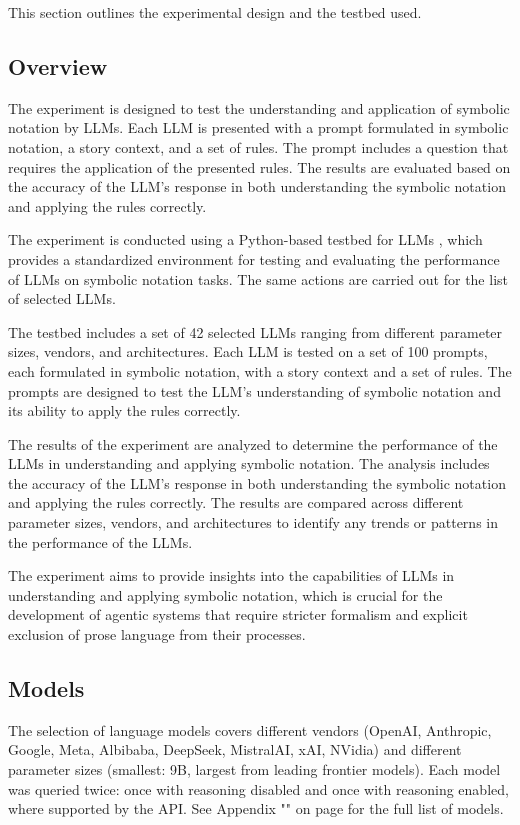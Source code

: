 This section outlines the experimental design and the testbed used.

\subsection{Overview}
The experiment is designed to test the understanding and application of symbolic notation by LLMs. Each LLM is presented with a prompt 
formulated in symbolic notation, a story context, and a set of rules. The prompt includes a question that requires the application of the 
presented rules. The results are evaluated based on the accuracy of the LLM's response in both understanding the symbolic notation and 
applying the rules correctly.

The experiment is conducted using a Python-based testbed for LLMs \autocite{aisymbolicprogllms}, which provides a standardized 
environment for testing and evaluating the performance of LLMs on symbolic notation tasks. The same actions are carried out for the list of 
selected LLMs.

The testbed includes a set of 42 selected LLMs ranging from different parameter sizes, vendors, and architectures. 
Each LLM is tested on a set of 100 prompts, each formulated in symbolic notation, with a story context and a set of rules. 
The prompts are designed to test the LLM's understanding of symbolic notation and its ability to apply the rules correctly.

The results of the experiment are analyzed to determine the performance of the LLMs in understanding and applying symbolic notation. 
The analysis includes the accuracy of the LLM's response in both understanding the symbolic notation and applying the rules correctly. 
The results are compared across different parameter sizes, vendors, and architectures to identify any trends or patterns in the performance of the LLMs.

The experiment aims to provide insights into the capabilities of LLMs in understanding and applying symbolic notation, which is crucial 
for the development of agentic systems that require stricter formalism and explicit exclusion of prose language from their processes.

\subsection{Models}
The selection of language models covers different vendors (OpenAI, Anthropic, Google, Meta, Albibaba, DeepSeek, MistralAI, xAI, NVidia) and different 
parameter sizes (smallest: 9B, largest from leading frontier models). Each model was queried twice: once with reasoning disabled and once with reasoning enabled, where supported by the API.
See Appendix "" on page \pageref{tab:models} for the full list of models.

